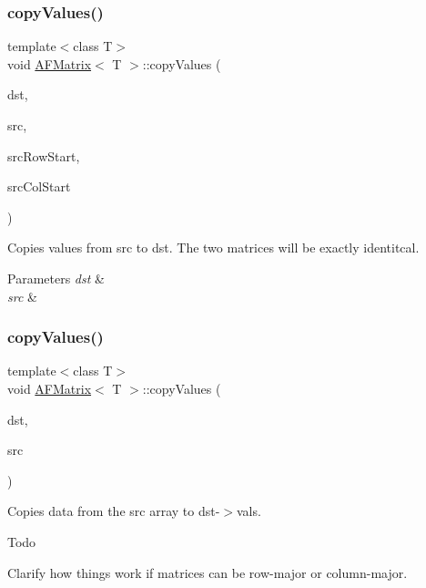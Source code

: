 \subsubsection{\texorpdfstring{copy\+Values()}{copyValues()}\hspace{0.1cm}{\footnotesize\ttfamily [2/4]}}
{\footnotesize\ttfamily template$<$class T$>$ \\
void \hyperlink{classAFMatrix}{A\+F\+Matrix}$<$ T $>$\+::copy\+Values (\begin{DoxyParamCaption}\item[{\hyperlink{classAFMatrix}{A\+F\+Matrix}$<$ T $>$ $\ast$}]{dst,  }\item[{\hyperlink{classAFMatrix}{A\+F\+Matrix}$<$ T $>$ $\ast$}]{src,  }\item[{size\+\_\+t}]{src\+Row\+Start,  }\item[{size\+\_\+t}]{src\+Col\+Start }\end{DoxyParamCaption})\hspace{0.3cm}{\ttfamily [inline]}}

Copies values from {\ttfamily src} to {\ttfamily dst}. The two matrices will be exactly identitcal. 
\begin{DoxyParams}{Parameters}
{\em dst} & \\
\hline
{\em src} & \\
\hline
\end{DoxyParams}
\mbox{\label{classAFMatrix_a63cc8c6b50d757fc75049a35a9123588}} 
\subsubsection{\texorpdfstring{copy\+Values()}{copyValues()}\hspace{0.1cm}{\footnotesize\ttfamily [3/4]}}
{\footnotesize\ttfamily template$<$class T$>$ \\
void \hyperlink{classAFMatrix}{A\+F\+Matrix}$<$ T $>$\+::copy\+Values (\begin{DoxyParamCaption}\item[{\hyperlink{classAFMatrix}{A\+F\+Matrix}$<$ T $>$ $\ast$}]{dst,  }\item[{vector$<$ T $>$ $\ast$}]{src }\end{DoxyParamCaption})\hspace{0.3cm}{\ttfamily [inline]}}

Copies data from the {\ttfamily src} array to {\ttfamily dst-\/$>$vals}. \begin{DoxyRefDesc}{Todo}
\item[\hyperlink{todo__todo000004}{Todo}]Clarify how things work if matrices can be row-\/major or column-\/major. \end{DoxyRefDesc}

